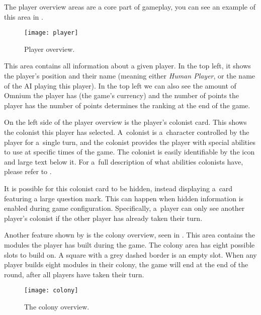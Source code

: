 The player overview areas are a core part of gameplay, you can see an example
of this area in .

\begin{figure}[ht]
\centerline{\mbox{\texttt{[image: player]}}}
\caption{Player overview.}\label{ud:player}
\end{figure}

This area contains all information about a given player. In the top left,
it shows the player's position and their name (meaning either \emph{Human Player},
or the name of the AI playing this player). In the top left we can also see
the amount of Omnium the player has (the game's currency) and the number of points
the player has the number of points determines the ranking at the end of the game.

On the left side of the player overview is the player's colonist card. This shows
the colonist this player has selected. A~colonist is a~character controlled
by the player for a~single turn, and the colonist provides the player with
special abilities to use at specific times of the game. The colonist is
easily identifiable by the icon and large text below it. For a~full description
of what abilities colonists have, please refer to .

It is possible for this colonist card to be hidden, instead displaying a~card
featuring a large question mark. This can happen when hidden information is enabled
during game configuration. Specifically, a~player can only see another player's
colonist if the other player has already taken their turn.

Another feature shown by  is the colony overview, seen in
. This area contains the modules the player has built during
the game. The colony area has eight possible slots to build on. A square with
a grey dashed border is an empty slot. When any player
builds eight modules in their colony, the game will end at the end of the round,
after all players have taken their turn.

\begin{figure}[ht]
\centerline{\mbox{\texttt{[image: colony]}}}
\caption{The colony overview.}\label{ud:colony}
\end{figure}

